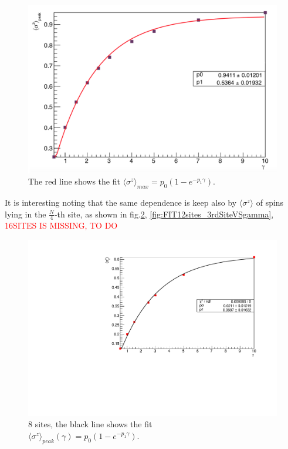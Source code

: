 \begin{figure}[H]
    \centering
    \includegraphics[scale=0.5]{Figures/FIT_PeakLMVsGamma.png}
    \caption{The red line shows the fit $\langle\sigma^z\rangle_{max} = p_0(1-e^{-p_1\gamma})$.}
    \label{fig:FIT_PeakLMvsGamma_J1051}
\end{figure}

It is interesting noting that the same dependence is keep also by $\langle\sigma^z\rangle$ of spins lying in the $\frac{N}{4}$-th site, as shown in fig.\ref{fig:FIT8sites_LM_2ndSiteVSgamma}, \ref{fig:FIT12sites_3rdSiteVSgamma}, \textcolor{red}{16SITES IS MISSING, TO DO}

\begin{figure}[H]
    \centering
    \includegraphics[scale=0.7]{Figures/8sites/FIT_8sites_2ndLMvsGamma.pdf}
    \caption{8 sites, the black line shows the fit \\$\langle\sigma^z\rangle_{peak}(\gamma) = p_0(1-e^{-p_1\gamma})$.}
    \label{fig:FIT8sites_LM_2ndSiteVSgamma}
\end{figure}


